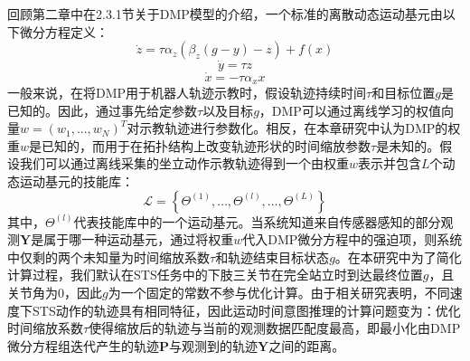 回顾第二章中在2.3.1节关于DMP模型的介绍，一个标准的离散动态运动基元由以下微分方程定义：
\begin{equation}
    \dot{z}=\tau \alpha_z\left(\beta_z(g-y)-z\right)+f(x)
    \label{eq:4-7}
\end{equation}
\begin{equation}
    \dot{y}=\tau z 
    \label{eq:4-8}
\end{equation}
\begin{equation}
    \dot{x}=-\tau \alpha_x x
    \label{eq:4-9}
\end{equation}
一般来说，在将DMP用于机器人轨迹示教时，假设轨迹持续时间$τ$和目标位置$g$是已知的。因此，通过事先给定参数$τ$以及目标$g$，DMP可以通过离线学习的权值向量$w=(w_1,...,w_N)^T$对示教轨迹进行参数化。相反，在本章研究中认为DMP的权重$w$是已知的，而用于在拓扑结构上改变轨迹形状的时间缩放参数$\tau$是未知的。假设我们可以通过离线采集的坐立动作示教轨迹得到一个由权重$w$表示并包含$L$个动态运动基元的技能库：
\begin{equation}
    \mathscr{L}=\left\{\Theta^{(1)}, \ldots, \Theta^{(l)}, \ldots, \Theta^{(L)}\right\}
    \label{eq:4-10}
\end{equation}
其中，$\Theta^{(l)}$代表技能库中的一个运动基元。当系统知道来自传感器感知的部分观测$\mathbf{Y}$是属于哪一种运动基元，通过将权重$w$代入DMP微分方程中的强迫项，则系统中仅剩的两个未知量为时间缩放系数$\tau$和轨迹结束目标状态$g$。在本研究中为了简化计算过程，我们默认在STS任务中的下肢三关节在完全站立时到达最终位置$g$，且关节角为0，因此$g$为一个固定的常数不参与优化计算。由于相关研究表明，不同速度下STS动作的轨迹具有相同特征，因此运动时间意图推理的计算问题变为：优化时间缩放系数$\tau$使得缩放后的轨迹与当前的观测数据匹配度最高，即最小化由DMP微分方程组迭代产生的轨迹$\mathbf{P}$与观测到的轨迹$\mathbf{Y}$之间的距离。

